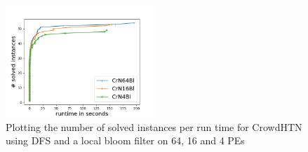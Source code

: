 \begin{figure}[!hbp]
	\caption{Plotting the number of solved instances per run time for CrowdHTN using DFS and a local bloom filter on 64, 16 and 4 PEs}
	\label{figure: eval scalability}
	\centering
	\includegraphics[width=0.5\textwidth]{images/final/scalability}
\end{figure}

